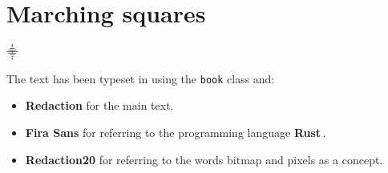 \documentclass[12pt,openany,a4,usenames,dvipsnames]{book}
\newcommand\bitmap{{\pixelfont{}bitmap}}
\newcommand\pixels{{\pixelfont{}pixels}}
\newcommand\Rust{{\fira{}\textbf{Rust}}}
\DeclareRobustCommand\TheEnd{%
\par%
\thispagestyle{empty}%
{\vfill{}\noindent{}\centering{}\symbola{}⸎\par}%
}
\begin{document}
\chapter{Marching squares}
\skelpar%
\TheEnd{}
\clearpage{}
\stopthumb
\backmatter
{}
\cleardoublepage
\printindex
\cleardoublepage
{}
\thispagestyle{empty}
\colophontitlesize{25pt}
\begin{colophon}
\noindent{}The text has been typeset in {\cm{}\XeLaTeX{}} using the \texttt{book} class and:
\begin{itemize}
  \item \textbf{Redaction} for the main text.
  \item \textbf{\fira{}Fira Sans} for referring to the programming language \Rust{}\,.
  \item \textbf{\pixelfont{}Redaction20} for referring to the words \bitmap{} and \pixels{} as a concept.
\end{itemize}
\end{colophon}
\clearpage{}
\listoftodos{}
\end{document}
